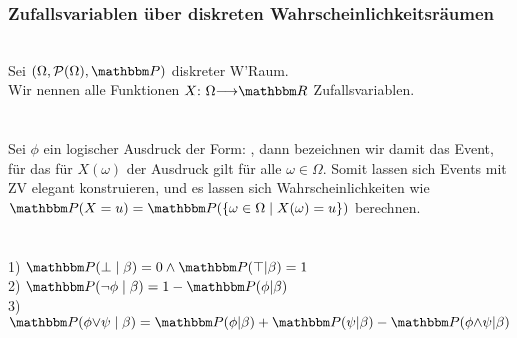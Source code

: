 \subsubsection*{Zufallsvariablen über diskreten Wahrscheinlichkeitsräumen}
 \\
Sei \((\Omega, \pro(\Omega), \Pro)\) diskreter W'Raum. \\
Wir nennen alle Funktionen \(X\QDp \Omega {\longrightarrow} \R\) Zufallsvariablen. \\ \\
 \\
Sei \(\phi\) ein logischer Ausdruck der Form: , dann bezeichnen wir damit das Event, für das für \(X(\omega)\) der Ausdruck gilt für alle \(\omega \in \Omega\). Somit lassen sich Events mit ZV elegant konstruieren, und es lassen sich Wahrscheinlichkeiten wie \(\Pro(X = u) = \Pro(\{{\omega \in \Omega} \mid {X(\omega) = u}\})\) berechnen. \\ \\
 \\
1) \(\Pro(\bot \mid \beta) = 0 \wedge \Pro(\top|\beta) = 1\) \\
2) \(\Pro(\neg\phi \mid \beta) = 1 - \Pro(\phi|\beta)\) \\
3) \(\Pro(\phi {\vee} \psi \mid \beta) = \Pro(\phi| \beta) + \Pro(\psi| \beta) - \Pro(\phi {\wedge} \psi| \beta)\)
